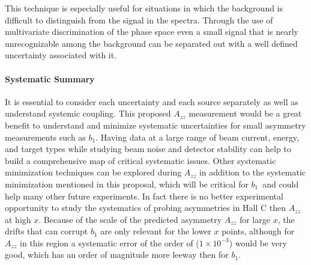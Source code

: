 This technique is especially useful for situations in which the background
is difficult to distinguish from the signal in the spectra.  Through the use of multivariate
discrimination of the phase space even a small signal that is nearly
unrecognizable among the background can be separated out with a well defined
uncertainty associated with it.
\fi

\paragraph{Systematic Summary}\mbox{}


It is essential to consider each uncertainty and each source separately as well as understand systemic coupling.  
This proposed $A_{zz}$ measurement would be a great benefit to understand and minimize systematic uncertainties for small asymmetry measurements such as $b_1$. Having data at a large range of beam
current, energy, and target types while studying beam noise and detector stability can help to build a comprehensive map of critical systematic issues. Other systematic minimization techniques can be explored during $A_{zz}$ in addition to the systematic minimization mentioned in this proposal, which will be critical for $b_1$~\need and could help many other future experiments. In fact there is no better experimental opportunity to study the systematics of probing asymmetries in Hall C then $A_{zz}$ at high $x$. Because of the scale of the predicted asymmetry $A_{zz}$ for large $x$, the drifts that can corrupt
$b_1$ are only relevant for the lower $x$ points, although for $A_{zz}$ in this region a systematic error of the order of ($1\times10^{-3}$) would be very good, which has an order of magnitude more leeway
then for $b_1$. 

